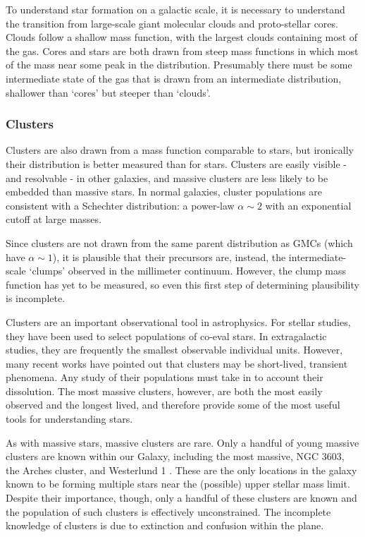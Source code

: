 To understand star formation on a galactic scale, it is necessary to understand
the transition from large-scale giant molecular clouds and proto-stellar cores.
Clouds follow a shallow mass function, with the largest clouds containing most
of the gas.  Cores and stars are both drawn from steep mass functions in which
most of the mass near some peak in the distribution.  Presumably there must be
some intermediate state of the gas that is drawn from an intermediate
distribution, shallower than `cores' but steeper than `clouds'.  

\subsubsection{Clusters}
Clusters are also drawn from a mass function comparable to stars, but
ironically their distribution is better measured than for stars.  Clusters are
easily visible - and resolvable - in other galaxies, and massive clusters are
less likely to be embedded than massive stars.  In normal galaxies, cluster
populations are consistent with a Schechter distribution: a power-law
$\alpha\sim2$ with an exponential cutoff at large masses.

Since clusters are not drawn from the same parent distribution as GMCs (which
have $\alpha\sim1$), it is plausible that their precursors are, instead, the
intermediate-scale `clumps' observed in the millimeter continuum.  However, the
clump mass function has yet to be measured, so even this first step of
determining plausibility is incomplete.

Clusters are an important observational tool in astrophysics.  For stellar
studies, they have been used to select populations of co-eval stars.  In
extragalactic studies, they are frequently the smallest observable individual
units.  However, many recent works have pointed out that clusters may be
short-lived, transient phenomena.  Any study of their populations must take
in to account their dissolution.  The most massive clusters, however, are both
the most easily observed and the longest lived, and therefore provide some of the
most useful tools for understanding stars.

As with massive stars, massive clusters are rare.  Only a handful of young
massive clusters are known within our Galaxy, including the most massive,  NGC
3603, the Arches cluster, and Westerlund 1 \citep{PortegiesZwart2010}.  These
are the only locations in the galaxy known to be forming multiple stars near
the (possible) upper stellar mass limit.  Despite their importance, though,
only a handful of these clusters are known and the population of such clusters
is effectively unconstrained.  The incomplete knowledge of clusters is due to
extinction  and confusion within the plane.


